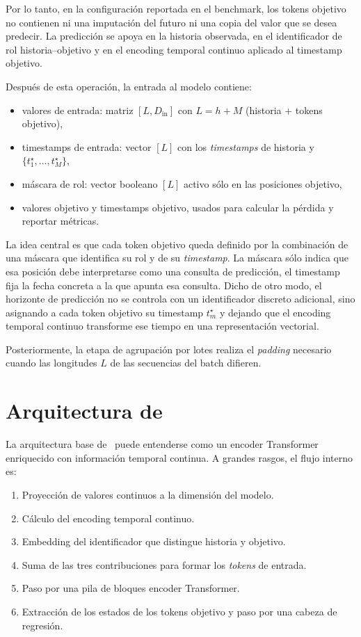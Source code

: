 Por lo tanto, en la configuración reportada en el benchmark, los tokens objetivo no contienen ni una imputación del futuro ni una copia del valor que se desea predecir. La predicción se apoya en la historia observada, en el identificador de rol historia--objetivo y en el encoding temporal continuo aplicado al timestamp objetivo.

Después de esta operación, la entrada al modelo contiene:
\begin{itemize}
    \item valores de entrada: matriz $[L, D_{\text{in}}]$ con $L = h+M$ (historia + tokens objetivo),
    \item timestamps de entrada: vector $[L]$ con los \emph{timestamps} de historia y $\{t^\star_1,\dots,t^\star_M\}$,
    \item máscara de rol: vector booleano $[L]$ activo sólo en las posiciones objetivo,
    \item valores objetivo y timestamps objetivo, usados para calcular la pérdida y reportar métricas.
\end{itemize}

La idea central es que cada token objetivo queda definido por la combinación de una máscara que identifica su rol y de su \emph{timestamp}. La máscara sólo indica que esa posición debe interpretarse como una consulta de predicción, el timestamp fija la fecha concreta a la que apunta esa consulta. Dicho de otro modo, el horizonte de predicción no se controla con un identificador discreto adicional, sino asignando a cada token objetivo su timestamp $t^\star_m$ y dejando que el encoding temporal continuo transforme ese tiempo en una representación vectorial.

Posteriormente, la etapa de agrupación por lotes realiza el \emph{padding} necesario cuando las longitudes $L$ de las secuencias del batch difieren.

\section{Arquitectura de \CTTransformer}
\label{sec:arquitectura-modelo}

La arquitectura base de \CTTransformer\ puede entenderse como un encoder Transformer enriquecido con información temporal continua. A grandes rasgos, el flujo interno es:

\begin{enumerate}
    \item Proyección de valores continuos a la dimensión del modelo.
    \item Cálculo del encoding temporal continuo.
    \item Embedding del identificador que distingue historia y objetivo.
    \item Suma de las tres contribuciones para formar los \emph{tokens} de entrada.
    \item Paso por una pila de bloques encoder Transformer.
    \item Extracción de los estados de los tokens objetivo y paso por una cabeza de regresión.
\end{enumerate}

